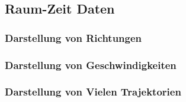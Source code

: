         \subsection{Raum-Zeit Daten} %

            \subsubsection{Darstellung von Richtungen} %

            \subsubsection{Darstellung von Geschwindigkeiten} %

            \subsubsection{Darstellung von Vielen Trajektorien} %
